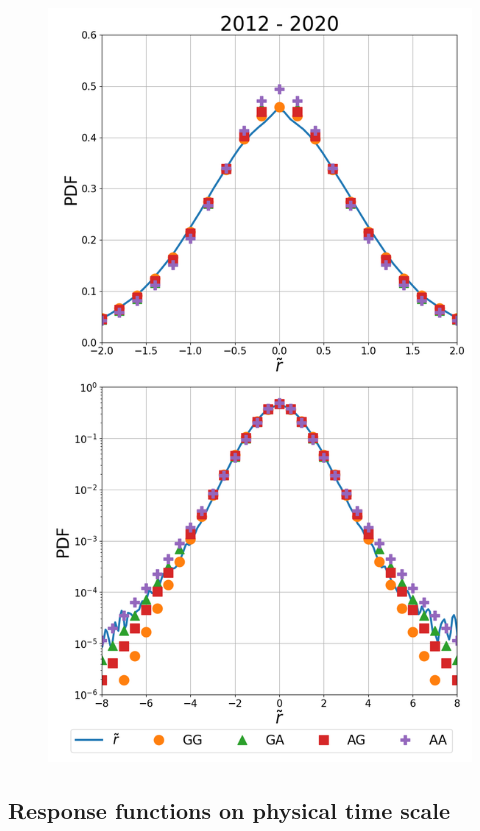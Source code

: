 \begin{figure}[htbp]
    \centering
    \includegraphics[width=\columnwidth]
    {figures/04_all_2012.png}
    \caption{}
    \label{fig:empirical_2012}
\end{figure}

\subsection{Response functions on physical time scale}
\label{subsec:response_function_physical}

